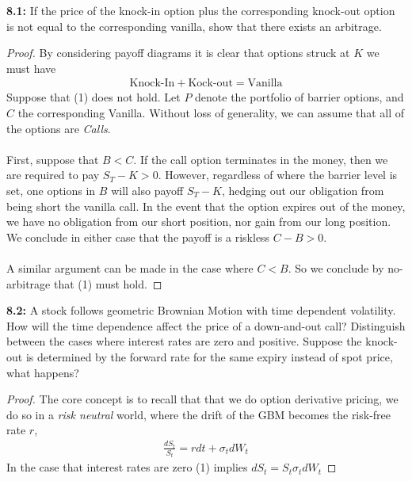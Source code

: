 \documentclass{article}
\begin{document}
\begin{tcolorbox}[colframe=black,colback=gray!5,boxrule=0.5pt]
\textbf{8.1:} If the price of the knock-in option plus the corresponding knock-out option is not equal to the corresponding vanilla, show that there exists an arbitrage. 
\end{tcolorbox}
\begin{proof}
    By considering payoff diagrams it is clear that options struck at $K$ we must have
    \begin{align*}
        \text{Knock-In} + \text{Kock-out} = \text{Vanilla} \tag{1}
    \end{align*}
    Suppose that (1) does not hold. Let $P$ denote the portfolio of barrier options, and $C$ the corresponding Vanilla. Without loss of generality, we can assume that all of the options are \textit{Calls}.\\
    \\
    First, suppose that $B< C$. If the call option terminates in the money, then we are required to pay $S_T-K>0$. However, regardless of where the barrier level is set, one options in $B$ will also payoff $S_T-K$, hedging out our obligation from being short the vanilla call. In the event that the option expires out of the money, we have no obligation from our  short position, nor gain from our long position. We conclude in either case that the payoff is a riskless $C-B > 0$. \\
    \\
    A similar argument can be made in the case where $C < B$. So we conclude by no-arbitrage that (1) must hold.
\end{proof}


\begin{tcolorbox}[colframe=black,colback=gray!5,boxrule=0.5pt]
\textbf{8.2:} A stock follows geometric Brownian Motion with time dependent volatility. How will the time dependence affect the price of a down-and-out call? Distinguish between the cases where interest rates are zero and positive. Suppose the knock-out is determined by the forward rate for the same expiry instead of spot price, what happens? 
\end{tcolorbox}
    \begin{proof} The core concept is to recall that that we do option derivative pricing, we do so in a \textit{risk neutral} world, where the drift of the GBM becomes the risk-free rate $r$,
    \begin{align*}
        \frac{dS_t}{S_t} = rdt + \sigma_t dW_t \tag{1}
    \end{align*}
    In the case that interest rates are zero (1) implies $dS_t = S_t\sigma_t dW_t$
\end{proof}
\end{document}
